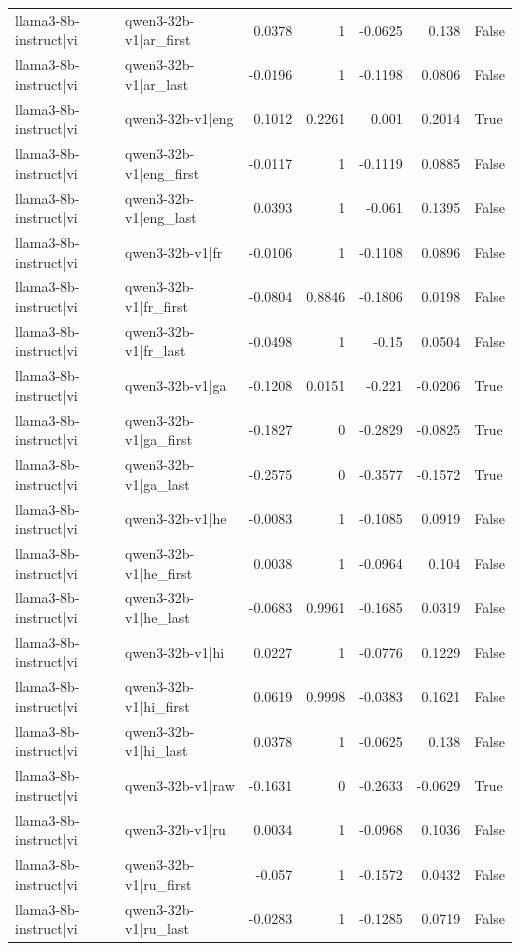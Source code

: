 \begin{table}
\begin{tabular}{l l r r r r l}
llama3-8b-instruct|vi & qwen3-32b-v1|ar_first & 0.0378 & 1 & -0.0625 & 0.138 & False \\
llama3-8b-instruct|vi & qwen3-32b-v1|ar_last & -0.0196 & 1 & -0.1198 & 0.0806 & False \\
llama3-8b-instruct|vi & qwen3-32b-v1|eng & 0.1012 & 0.2261 & 0.001 & 0.2014 & True \\
llama3-8b-instruct|vi & qwen3-32b-v1|eng_first & -0.0117 & 1 & -0.1119 & 0.0885 & False \\
llama3-8b-instruct|vi & qwen3-32b-v1|eng_last & 0.0393 & 1 & -0.061 & 0.1395 & False \\
llama3-8b-instruct|vi & qwen3-32b-v1|fr & -0.0106 & 1 & -0.1108 & 0.0896 & False \\
llama3-8b-instruct|vi & qwen3-32b-v1|fr_first & -0.0804 & 0.8846 & -0.1806 & 0.0198 & False \\
llama3-8b-instruct|vi & qwen3-32b-v1|fr_last & -0.0498 & 1 & -0.15 & 0.0504 & False \\
llama3-8b-instruct|vi & qwen3-32b-v1|ga & -0.1208 & 0.0151 & -0.221 & -0.0206 & True \\
llama3-8b-instruct|vi & qwen3-32b-v1|ga_first & -0.1827 & 0 & -0.2829 & -0.0825 & True \\
llama3-8b-instruct|vi & qwen3-32b-v1|ga_last & -0.2575 & 0 & -0.3577 & -0.1572 & True \\
llama3-8b-instruct|vi & qwen3-32b-v1|he & -0.0083 & 1 & -0.1085 & 0.0919 & False \\
llama3-8b-instruct|vi & qwen3-32b-v1|he_first & 0.0038 & 1 & -0.0964 & 0.104 & False \\
llama3-8b-instruct|vi & qwen3-32b-v1|he_last & -0.0683 & 0.9961 & -0.1685 & 0.0319 & False \\
llama3-8b-instruct|vi & qwen3-32b-v1|hi & 0.0227 & 1 & -0.0776 & 0.1229 & False \\
llama3-8b-instruct|vi & qwen3-32b-v1|hi_first & 0.0619 & 0.9998 & -0.0383 & 0.1621 & False \\
llama3-8b-instruct|vi & qwen3-32b-v1|hi_last & 0.0378 & 1 & -0.0625 & 0.138 & False \\
llama3-8b-instruct|vi & qwen3-32b-v1|raw & -0.1631 & 0 & -0.2633 & -0.0629 & True \\
llama3-8b-instruct|vi & qwen3-32b-v1|ru & 0.0034 & 1 & -0.0968 & 0.1036 & False \\
llama3-8b-instruct|vi & qwen3-32b-v1|ru_first & -0.057 & 1 & -0.1572 & 0.0432 & False \\
llama3-8b-instruct|vi & qwen3-32b-v1|ru_last & -0.0283 & 1 & -0.1285 & 0.0719 & False \\

\end{tabular}
\end{table}
